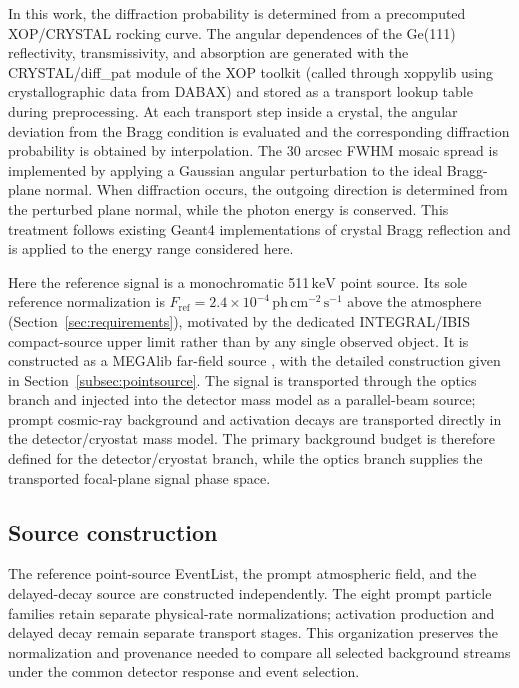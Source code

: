 \documentclass[11pt]{article}
\newcommand{\keV}{\ensuremath{\,\mathrm{keV}}}
\newcommand{\phcms}{\ensuremath{\,\mathrm{ph\,cm^{-2}\,s^{-1}}}}
\newcommand{\fref}{F_{\mathrm{ref}}}
\begin{document}
In this work, the diffraction probability is determined from a precomputed XOP/CRYSTAL rocking curve. The angular dependences of the Ge(111) reflectivity, transmissivity, and absorption are generated with the CRYSTAL/diff\_pat module of the XOP toolkit (called through xoppylib using crystallographic data from DABAX) \cite{SanchezDelRio2011XOP} and stored as a transport lookup table during preprocessing. At each transport step inside a crystal, the angular deviation from the Bragg condition is evaluated and the corresponding diffraction probability is obtained by interpolation. The 30 arcsec FWHM mosaic spread is implemented by applying a Gaussian angular perturbation to the ideal Bragg-plane normal. When diffraction occurs, the outgoing direction is determined from the perturbed plane normal, while the photon energy is conserved. This treatment follows existing Geant4 implementations of crystal Bragg reflection \cite{Guan2023BraggReflection,Reiazi2025G4BraggReflection} and is applied to the energy range considered here.

Here the reference signal is a monochromatic 511\keV{} point source. Its sole
reference normalization is $\fref=2.4\times10^{-4}\phcms$ above the atmosphere
(Section~\ref{sec:requirements}), motivated by the dedicated INTEGRAL/IBIS
compact-source upper limit \cite{DeCesare2011} rather than by any single
observed object. It is constructed as a MEGAlib far-field source
\cite{Zoglauer2006}, with the detailed construction given in
Section~\ref{subsec:pointsource}. The signal is transported through the optics
branch and injected into the detector mass model as a parallel-beam source;
prompt cosmic-ray background and activation decays are transported directly in
the detector/cryostat mass model. The primary background budget is therefore
defined for the detector/cryostat branch, while the optics branch supplies the
transported focal-plane signal phase space.

\subsection{Source construction}
\label{sec:background}

The reference point-source EventList, the prompt atmospheric field, and the
delayed-decay source are constructed independently. The eight prompt
particle families retain separate physical-rate normalizations; activation production and delayed
decay remain separate transport stages. This organization preserves the
normalization and provenance needed to compare all selected background streams
under the common detector response and event selection.
\end{document}
